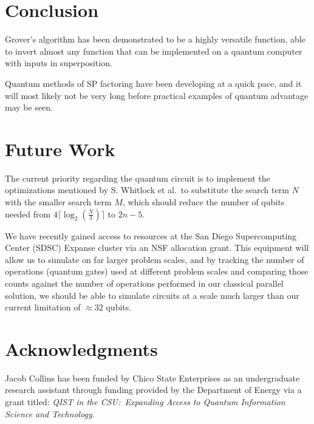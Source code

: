 \documentclass[twocolumn]{cinc}
\begin{document}
\section{Conclusion}

\balance

Grover's algorithm has been demonstrated to be a highly versatile function,
able to invert almost any function that can be implemented on a quantum 
computer with inputs in superposition.

Quantum methods of SP factoring have been developing at a quick pace,
and it will most likely not be very long before practical examples
of quantum advantage may be seen.

\section{Future Work}
 
The current priority regarding the quantum circuit is to implement the optimizations
mentioned by S. Whitlock et al.\ to substitute the search term $N$ with the smaller
search term $M$, which should reduce the number of qubits needed from 
$4 \lceil \log_2(\frac{N}{3})\rceil$ to $2n-5$.

We have recently gained access to resources at the San Diego Supercomputing 
Center (SDSC) Expanse cluster via an NSF allocation grant. This equipment will allow us to
simulate on far larger problem scales, and by tracking the number of operations (quantum gates)
used at different problem scales and comparing those counts against the number of operations
performed in our classical parallel solution, we should be able to simulate circuits at a scale
much larger than our current limitation of $\approx 32$ qubits.

\section*{Acknowledgments}  
% 
Jacob Collins has been funded by Chico State Enterprises as an undergraduate research assistant
through funding provided by the Department of Energy via a grant titled: \emph{QIST in the CSU:\ 
Expanding Access to Quantum Information Science and Technology.}


\end{document}
